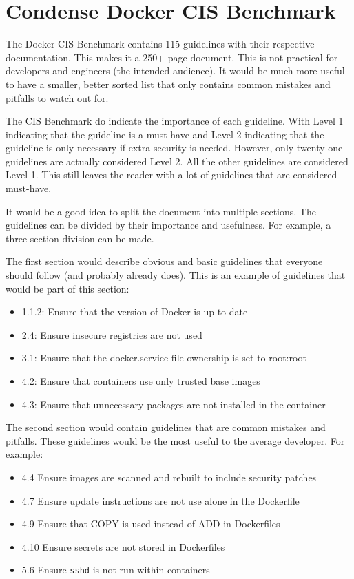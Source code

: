 \section{Condense Docker CIS Benchmark}

The Docker CIS Benchmark contains 115 guidelines with their respective documentation.
This makes it a 250+ page document. This is not practical for developers and engineers (the intended audience). It would be much more useful to have a smaller, better sorted list that only contains common mistakes and pitfalls to watch out for.

\medskip

The CIS Benchmark do indicate the importance of each guideline.
With Level 1 indicating that the guideline is a must-have and Level 2 indicating that the guideline is only necessary if extra security is needed. However, only twenty-one guidelines are actually considered Level 2. All the other guidelines are considered Level 1. This still leaves the reader with a lot of guidelines that are considered must-have.

\medskip

It would be a good idea to split the document into multiple sections. The guidelines can be divided by their importance and usefulness. For example, a three section division can be made.

\medskip

The first section would describe obvious and basic guidelines that everyone should follow (and probably already does). This is an example of guidelines that would be part of this section:
\begin{itemize}
    \item 1.1.2: Ensure that the version of Docker is up to date
    \item 2.4: Ensure insecure registries are not used
    \item 3.1: Ensure that the docker.service file ownership is set to root:root
    \item 4.2: Ensure that containers use only trusted base images
    \item 4.3: Ensure that unnecessary packages are not installed in the container
\end{itemize}

\medskip

The second section would contain guidelines that are common mistakes and pitfalls. These guidelines would be the most useful to the average developer. For example:
\begin{itemize}
    \item 4.4 Ensure images are scanned and rebuilt to include security patches
    \item 4.7 Ensure update instructions are not use alone in the Dockerfile
    \item 4.9 Ensure that COPY is used instead of ADD in Dockerfiles
    \item 4.10 Ensure secrets are not stored in Dockerfiles
    \item 5.6 Ensure \lstinline{sshd} is not run within containers
\end{itemize}

